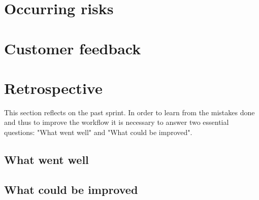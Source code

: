 \section{Occurring risks}
\section{Customer feedback}
\section{Retrospective}
This section reflects on the past sprint. In order to learn from the mistakes done and thus to improve the workflow it is necessary to answer two essential questions: "What went well" and "What could be improved".

\subsection{What went well}
\subsection{What could be improved}
